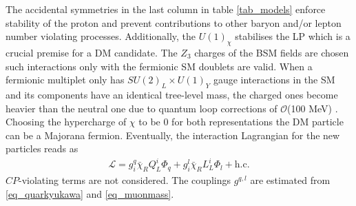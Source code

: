 The accidental symmetries in the last column in table \ref{tab_models}
enforce stability of the proton and prevent contributions to other baryon and/or lepton number violating
processes. Additionally, the $U(1)_\chi$ stabilises the LP which is a crucial premise for a DM candidate. The $Z_3$ charges of the BSM fields are
chosen such interactions only with the fermionic SM doublets are valid.
When a fermionic multiplet only has $SU(2)_L\times U(1)_Y$ gauge interactions in the SM and its components have an identical tree-level mass, the charged 
ones become heavier than the neutral one due to quantum loop corrections of $\mathcal{O}$(100 MeV) \cite{Hisano}\cite{minMatter}. Choosing 
the hypercharge of $\chi$ to be 0 for both representations the DM particle can be a Majorana fermion. Eventually, 
the interaction Lagrangian for the new particles reads as
\begin{align}
 \mathcal{L} = g_i^q \bar \chi_R Q_L^i \Phi_q + g_i^l \bar \chi_R L_L^i \Phi_l + \text{h.c.}
 \label{eq_modelLagrangian}
\end{align}
$CP$-violating terms are not considered. The couplings $g^{q,l}$ are estimated from \eqref{eq_quarkyukawa} and \eqref{eq_muonmass}.